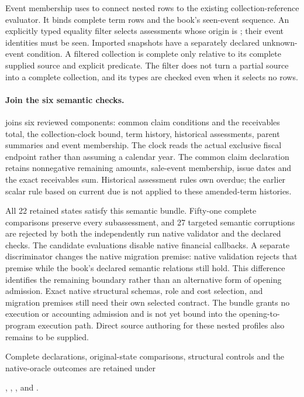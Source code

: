 Event membership uses  to connect nested
rows to the existing collection-reference evaluator. It binds complete term
rows and the book's
seen-event sequence. An explicitly typed equality filter selects assessments
whose origin is ; their event identities must be seen.
Imported snapshots have a separately declared unknown-event condition. A
filtered collection is complete only relative to its complete supplied source
and explicit predicate. The filter does not turn a partial source into a
complete collection, and its types are checked even when it selects no rows.

\paragraph{Join the six semantic checks.}
 joins six reviewed components: common claim
conditions and the receivables total, the collection-clock bound, term history,
historical assessments, parent summaries and event membership. The clock reads
the actual exclusive fiscal endpoint rather than assuming a calendar year.
The common claim declaration retains nonnegative remaining amounts, sale-event
membership, issue dates and the exact receivables sum. Historical assessment
rules own overdue; the earlier scalar rule based on current due is not applied
to these amended-term histories.

All 22 retained states satisfy this semantic bundle. Fifty-one complete
comparisons preserve every subassessment, and 27 targeted semantic corruptions
are rejected by both the independently run native validator and the declared
checks. The candidate evaluations disable native financial callbacks. A
separate discriminator changes the native migration premise: native validation
rejects that premise while the book's declared semantic relations still hold.
This difference identifies the remaining boundary rather than an alternative
form of opening admission. Exact native structural schemas, role and cost
selection, and migration premises still need their own selected contract.
The bundle grants no execution or accounting admission and is not yet bound
into the opening-to-program execution path. Direct source authoring for these
nested profiles also remains to be supplied.

Complete declarations, original-state comparisons, structural controls and
the native-oracle outcomes are retained under
\begingroup\raggedright
{},
,
,
and .
\par\endgroup
